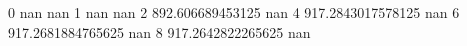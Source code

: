 0 nan nan
1 nan nan
2 892.606689453125 nan
4 917.2843017578125 nan
6 917.2681884765625 nan
8 917.2642822265625 nan
